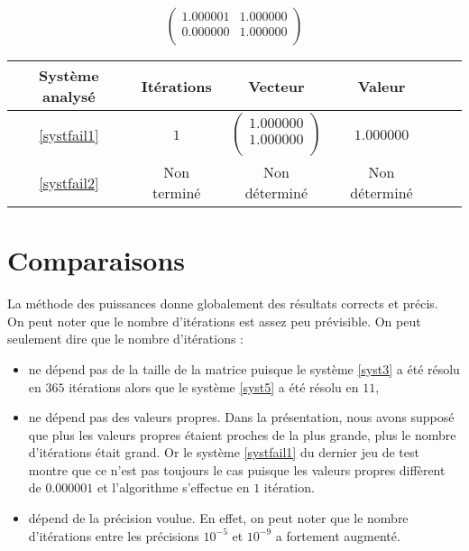 \documentclass{report}
\begin{document}
	  \begin{equation}
	  \begin{pmatrix}
	  1.000001 & 1.000000 \\ 
	  0.000000 & 1.000000 \\ 
	  \end{pmatrix}
	  \label{systfail2}
	  \end{equation}
	  
	\renewcommand{\arraystretch}{1.8}
	\begin{tabular}{|c|c|c|c|c|c|}
	  \hline
	  Système analysé &Itérations& Vecteur & Valeur\\
	  \hline
	  \eqref{systfail1}& $1$ & $\begin{pmatrix}
				    1.000000 \\ 
				    1.000000 \\ 
				    \end{pmatrix}$ & $ 1.000000 $ \\
	  \hline
	  \eqref{systfail2} & Non terminé & Non déterminé & Non déterminé \\
	  \hline
	 \end{tabular}
	 \renewcommand{\arraystretch}{1}
	 \newpage
    \section{Comparaisons}
    La méthode des puissances donne globalement des résultats corrects et précis. \\
    
    On peut noter que le nombre d'itérations est assez peu prévisible. On peut seulement dire que le nombre d'itérations :
    \begin{itemize}
    \item{ne dépend pas de la taille de la matrice puisque le système \eqref{syst3} a été résolu en $365$ itérations alors que le système \eqref{syst5} a été résolu en $11$,}
    \item{ne dépend pas des valeurs propres. Dans la présentation, nous avons supposé que plus les valeurs propres étaient proches de la plus grande, plus le nombre d'itérations était grand. Or le système \eqref{systfail1} du dernier jeu de test montre que ce n'est pas toujours le cas puisque les valeurs propres diffèrent de $0.000001$ et l'algorithme s'effectue en $1$ itération.}
    \item{dépend de la précision voulue. En effet, on peut noter que le nombre d'itérations entre les précisions $10^{-5}$ et $10^{-9}$ a fortement augmenté.}
    \end{itemize}
    
\end{document}
